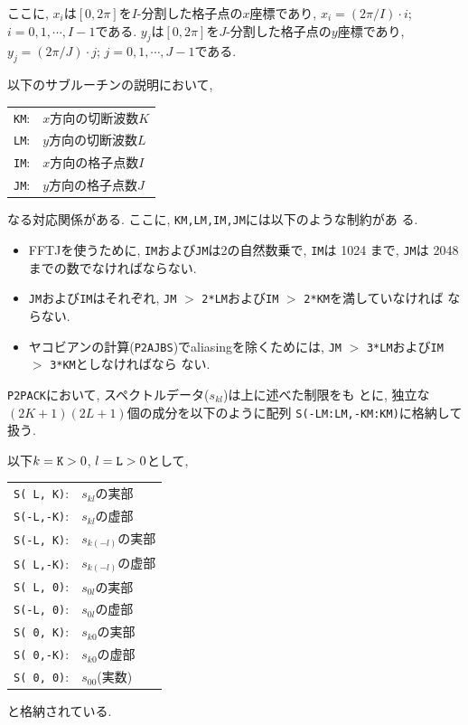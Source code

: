 \documentclass[a4j,fleqn]{jarticle}
\begin{document}
ここに, $x_i$は$[0,2\pi]$を$I$-分割した格子点の$x$座標であり,
$x_i=(2\pi/I)\cdot i$;  $i=0,1,\cdots,I-1$である.
$y_j$は$[0,2\pi]$を$J$-分割した格子点の$y$座標であり,
$y_j=(2\pi/J)\cdot j$;  $j=0,1,\cdots,J-1$である.

以下のサブルーチンの説明において,
\begin{center}
\begin{tabular}{rl}
{\tt KM}:& $x$方向の切断波数$K$\\
{\tt LM}:& $y$方向の切断波数$L$\\
{\tt IM}:& $x$方向の格子点数$I$\\
{\tt JM}:& $y$方向の格子点数$J$
\end{tabular}
\end{center}
なる対応関係がある. ここに, {\tt KM,LM,IM,JM}には以下のような制約があ
る.

\begin{itemize}
\item FFTJを使うために, {\tt IM}および{\tt JM}は2の自然数乗で,
{\tt IM}は 1024 まで, {\tt JM}は 2048 までの数でなければならない.

\item {\tt JM}および{\tt IM}はそれぞれ, 
{\tt JM} $>$ {\tt 2*LM}および{\tt IM} $>$ {\tt 2*KM}を満していなければ
ならない.

\item ヤコビアンの計算({\tt P2AJBS})でaliasingを除くためには, 
{\tt JM} $>$ {\tt 3*LM}および{\tt IM} $>$ {\tt 3*KM}としなければなら
ない.
\end{itemize}

{\tt P2PACK}において, スペクトルデータ($s_{kl}$)は上に述べた制限をも
とに, 独立な$(2K+1)(2L+1)$個の成分を以下のように配列
{\tt S(-LM:LM,-KM:KM)}に格納して扱う.

以下$k=\mbox{\tt K}>0$, $l=\mbox{\tt L}>0$として,
\begin{center}
\begin{tabular}{ll}
{\tt S( L, K)}:& $s_{kl}$の実部\\
{\tt S(-L,-K)}:& $s_{kl}$の虚部\\
{\tt S(-L, K)}:& $s_{k(-l)}$の実部\\
{\tt S( L,-K)}:& $s_{k(-l)}$の虚部\\
{\tt S( L, 0)}:& $s_{0l}$の実部\\
{\tt S(-L, 0)}:& $s_{0l}$の虚部\\
{\tt S( 0, K)}:& $s_{k0}$の実部\\
{\tt S( 0,-K)}:& $s_{k0}$の虚部\\
{\tt S( 0, 0)}:& $s_{00}$(実数)
\end{tabular}
\end{center}
と格納されている.
\end{document}
